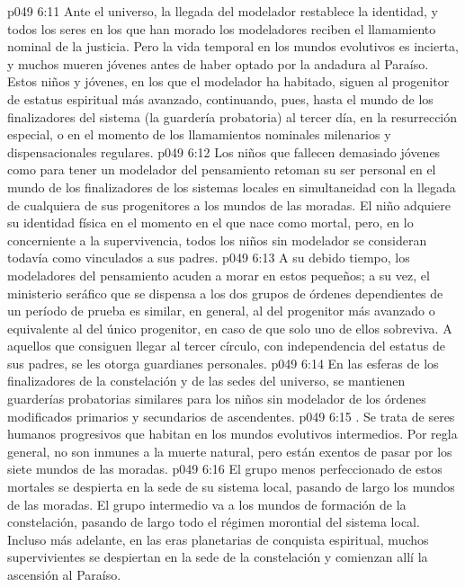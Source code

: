 \vs p049 6:11  Ante el universo, la llegada del modelador restablece la identidad, y todos los seres en los que han morado los modeladores reciben el llamamiento nominal de la justicia. Pero la vida temporal en los mundos evolutivos es incierta, y muchos mueren jóvenes antes de haber optado por la andadura al Paraíso. Estos niños y jóvenes, en los que el modelador ha habitado, siguen al progenitor de estatus espiritual más avanzado, continuando, pues, hasta el mundo de los finalizadores del sistema (la guardería probatoria) al tercer día, en la resurrección especial, o en el momento de los llamamientos nominales milenarios y dispensacionales regulares.
\vs p049 6:12 Los niños que fallecen demasiado jóvenes como para tener un modelador del pensamiento retoman su ser personal en el mundo de los finalizadores de los sistemas locales en simultaneidad con la llegada de cualquiera de sus progenitores a los mundos de las moradas. El niño adquiere su identidad física en el momento en el que nace como mortal, pero, en lo concerniente a la supervivencia, todos los niños sin modelador se consideran todavía como vinculados a sus padres.
\vs p049 6:13 A su debido tiempo, los modeladores del pensamiento acuden a morar en estos pequeños; a su vez, el ministerio seráfico que se dispensa a los dos grupos de órdenes dependientes de un período de prueba es similar, en general, al del progenitor más avanzado o equivalente al del único progenitor, en caso de que solo uno de ellos sobreviva. A aquellos que consiguen llegar al tercer círculo, con independencia del estatus de sus padres, se les otorga guardianes personales.
\vs p049 6:14 En las esferas de los finalizadores de la constelación y de las sedes del universo, se mantienen guarderías probatorias similares para los niños sin modelador de los órdenes modificados primarios y secundarios de ascendentes.
\vs p049 6:15 . Se trata de seres humanos progresivos que habitan en los mundos evolutivos intermedios. Por regla general, no son inmunes a la muerte natural, pero están exentos de pasar por los siete mundos de las moradas.
\vs p049 6:16 El grupo menos perfeccionado de estos mortales se despierta en la sede de su sistema local, pasando de largo los mundos de las moradas. El grupo intermedio va a los mundos de formación de la constelación, pasando de largo todo el régimen morontial del sistema local. Incluso más adelante, en las eras planetarias de conquista espiritual, muchos supervivientes se despiertan en la sede de la constelación y comienzan allí la ascensión al Paraíso.
